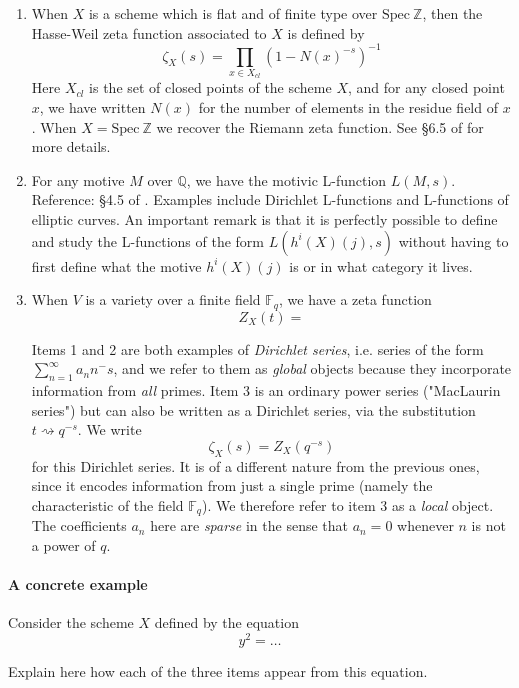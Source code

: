 \documentclass[paper=a4, fontsize=11pt]{scrartcl} %
\numberwithin{equation}{section} %
\numberwithin{figure}{section} %
\numberwithin{table}{section} %
\begin{document}
\begin{enumerate}

\item When $X$ is a scheme which is flat and of finite type over $\mathrm{Spec} \ \mathbb{Z}$, then the Hasse-Weil zeta function associated to $X$ is defined by
$$ \zeta_X(s) = \prod_{x \in X_{cl}} \left( 1 - N(x)^{-s}   \right)^{-1}  $$
Here $X_{cl}$ is the set of closed points of the scheme $X$, and for any closed point $x$, we have written $N(x)$ for the number of elements in the residue field of $x$. When $X = \mathrm{Spec} \ \mathbb{Z}$ we recover the Riemann zeta function. See \S 6.5 of \cite{Mustata} for more details.
\item For any motive $M$ over $\mathbb{Q}$, we have the motivic L-function $L(M, s)$. Reference: \S 4.5 of \cite{Farmer17}. Examples include Dirichlet L-functions and L-functions of elliptic curves. An important remark is that it is perfectly possible to define and study the L-functions of the form $L(h^i(X)(j), s)$ without having to first define what the motive $h^i(X)(j)$ is or in what category it lives.
\item When $V$ is a variety over a finite field $\mathbb{F}_q$, we have a zeta function
$$  Z_X(t) =   $$


Items 1 and 2 are both examples of \emph{Dirichlet series}, i.e. series of the form $\sum_{n=1}^{\infty} a_n n^-s$, and we refer to them as \emph{global} objects because they incorporate information from \emph{all} primes. Item 3 is an ordinary power series ("MacLaurin series") but can also be written as a Dirichlet series, via the substitution $t \rightsquigarrow q^{-s}$. We write
$$ \zeta_X(s) = Z_X(q^{-s})  $$
for this Dirichlet series. It is of a different nature from the previous ones, since it encodes information from just a single prime (namely the characteristic of the field $\mathbb{F}_q$). We therefore refer to item 3 as a \emph{local} object. The coefficients $a_n$ here are \emph{sparse} in the sense that $a_n = 0$ whenever $n$ is not a power of $q$.

\end{enumerate}

\paragraph{A concrete example} Consider the scheme $X$ defined by the equation
$$  y^2 = \ldots $$

Explain here how each of the three items appear from this equation.
\end{document}
